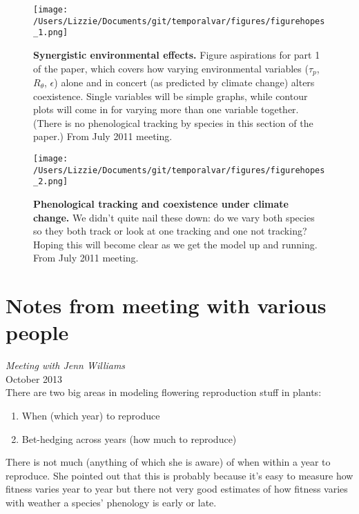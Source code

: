 \documentclass[11pt,a4paper,oneside]{article}
\begin{document}
\newpage
\begin{figure}[h!]
\centering
\noindent \texttt{[image: /Users/Lizzie/Documents/git/temporalvar/figures/figurehopes\_1.png]}
\caption{{\bf Synergistic environmental effects.}  Figure aspirations
  for part 1 of the paper, which covers how varying environmental
  variables (\(\tau_{p}\), \(R_{\theta}\), \(\epsilon\)) alone and in concert (as predicted by climate change)
  alters coexistence. Single variables will be simple graphs, while
  contour plots will come in for varying more than one variable
  together. (There is no phenological tracking by species in this
  section of the paper.) From July 2011 meeting.}
\end{figure}

\newpage
\begin{figure}[h!]
\centering
\noindent \texttt{[image: /Users/Lizzie/Documents/git/temporalvar/figures/figurehopes\_2.png]}
\caption{{\bf Phenological tracking and coexistence under climate
    change.}  We didn't quite nail these down: do we vary both species
so they both track or look at one tracking and one not tracking?
Hoping this will become clear as we get the model up and running. From July 2011 meeting.}
\end{figure}



\newpage
\section{Notes from meeting with various people}

\noindent \emph{Meeting with Jenn Williams} \\

 October 2013\\

\noindent  There are two big areas in modeling flowering reproduction stuff in plants:
\begin{enumerate}
\item When (which year) to reproduce
\item Bet-hedging across years (how much to reproduce)
\end{enumerate}

\noindent There is not much (anything of which she is aware) of when within a year to reproduce. She pointed out that this is probably because it's easy to measure how fitness varies year to year but there not very good estimates of how fitness varies with weather a species' phenology is early or late.\\
\end{document}
